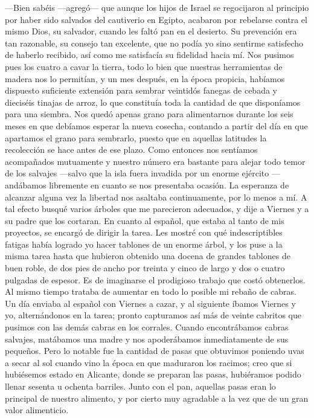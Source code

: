 \documentclass{novela}
\begin{document}
    —Bien sabéis —agregó— que aunque los hijos de Israel se regocijaron al principio por haber sido salvados del cautiverio en Egipto, acabaron por rebelarse contra el mismo Dios, su salvador, cuando les faltó pan en el desierto.
    Su prevención era tan razonable, su consejo tan excelente, que no podía yo sino sentirme satisfecho de haberlo recibido, así como me satisfacía su fidelidad hacia mí. Nos pusimos pues los cuatro a cavar la tierra, todo lo bien que nuestras herramientas de madera nos lo permitían, y un mes después, en la época propicia, habíamos dispuesto suficiente extensión para sembrar veintidós fanegas de cebada y dieciséis tinajas de arroz, lo que constituía toda la cantidad de que disponíamos para una siembra. Nos quedó apenas grano para alimentarnos durante los seis meses en que debíamos esperar la nueva cosecha, contando a partir del día en que apartamos el grano para sembrarlo, puesto que en aquellas latitudes la recolección se hace antes de ese plazo.
    Como entonces nos sentíamos acompañados mutuamente y nuestro número era bastante para alejar todo temor de los salvajes —salvo que la isla fuera invadida por un enorme ejército —andábamos libremente en cuanto se nos presentaba ocasión. La esperanza de alcanzar alguna vez la libertad nos asaltaba continuamente, por lo menos a mí. A tal efecto busqué varios árboles que me parecieron adecuados, y dije a Viernes y a su padre que los cortaran. En cuanto al español, que estaba al tanto de mis proyectos, se encargó de dirigir la tarea. Les mostré con qué indescriptibles fatigas había logrado yo hacer tablones de un enorme árbol, y los puse a la misma tarea hasta que hubieron obtenido una docena de grandes tablones de buen roble, de dos pies de ancho por treinta y cinco de largo y dos o cuatro pulgadas de espesor. Es de imaginarse el prodigioso trabajo que costó obtenerlos.
    Al mismo tiempo trataba de aumentar en todo lo posible mi rebaño de cabras. Un día enviaba al español con Viernes a cazar, y al siguiente íbamos Viernes y yo, alternándonos en la tarea; pronto capturamos así más de veinte cabritos que pusimos con las demás cabras en los corrales. Cuando encontrábamos cabras salvajes, matábamos una madre y nos apoderábamos inmediatamente de sus pequeños. Pero lo notable fue la cantidad de pasas que obtuvimos poniendo uvas a secar al sol cuando vino la época en que maduraron los racimos; creo que si hubiésemos estado en Alicante, donde se preparan las pasas, hubiéramos podido llenar sesenta u ochenta barriles. Junto con el pan, aquellas pasas eran lo principal de nuestro alimento, y por cierto muy agradable a la vez que de un gran valor alimenticio.
\end{document}
